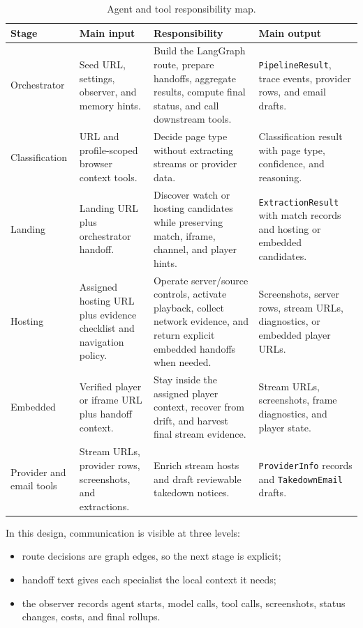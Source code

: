 \begin{table}[!htbp]
\centering
{\small
\setlength{\tabcolsep}{4pt}
\renewcommand{\arraystretch}{1.15}
\begin{tabularx}{\textwidth}{Q{2.65cm} Y Y Y}
\toprule
{}
Stage & Main input & Responsibility & Main output \\
\midrule
Orchestrator & Seed URL, settings, observer, and memory hints. & Build the
LangGraph route, prepare handoffs, aggregate results, compute final status, and
call downstream tools. & \texttt{PipelineResult}, trace events, provider rows,
and email drafts. \\
Classification & URL and profile-scoped browser context tools. & Decide page
type without extracting streams or provider data. & Classification result with
page type, confidence, and reasoning. \\
Landing & Landing URL plus orchestrator handoff. & Discover watch or hosting
candidates while preserving match, iframe, channel, and player hints. &
\texttt{ExtractionResult} with match records and hosting or embedded candidates. \\
Hosting & Assigned hosting URL plus evidence checklist and navigation policy.
& Operate server/source controls, activate playback, collect network evidence,
and return explicit embedded handoffs when needed. & Screenshots, server rows,
stream URLs, diagnostics, or embedded player URLs. \\
Embedded & Verified player or iframe URL plus handoff context. & Stay inside
the assigned player context, recover from drift, and harvest final stream
evidence. & Stream URLs, screenshots, frame diagnostics, and player state. \\
Provider and email tools & Stream URLs, provider rows, screenshots, and
extractions. & Enrich stream hosts and draft reviewable takedown notices. &
\texttt{ProviderInfo} records and \texttt{TakedownEmail} drafts. \\
\bottomrule
\end{tabularx}
}
\caption{Agent and tool responsibility map.}\label{tab:agent-responsibilities}
\end{table}

In this design, communication is visible at three levels:
\begin{itemize}
  \item route decisions are graph edges, so the next stage is explicit;
  \item handoff text gives each specialist the local context it needs;
  \item the observer records agent starts, model calls, tool calls, screenshots,
  status changes, costs, and final rollups.
\end{itemize}


